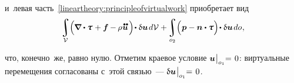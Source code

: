 \begin{otherlanguage}{russian}
\vspace{-0.2em} \noindent и~левая часть~\eqref{lineartheory:principleofvirtualwork} приобретает вид
\[
\integral\displaylimits_{\mathcal{V}} \hspace{-0.5ex} \left(^{\mathstrut} \hspace{-0.2ex} \boldnabla \dotp \mathboldtau \hspace{0.12ex} + \bm{f} \hspace{-0.1ex} - \hspace{-0.1ex} \rho \hspace{0.1ex} \mathdotdotabove{\bm{u}} \hspace{0.25ex} \right) \hspace{-0.32ex} \dotp \variation{\bm{u}} \hspace{0.25ex} d\mathcal{V} + \hspace{-0.2ex}
\integral\displaylimits_{o_2} \hspace{-0.5ex} \left(^{\mathstrut} \bm{p} - \bm{n} \dotp \mathboldtau \right) \hspace{-0.32ex} \dotp \variation{\bm{u}} \hspace{0.25ex} do \hspace{0.1ex},
\]

\vspace{-0.4em} \noindent что, конечно~же, равно нулю. Отметим краевое условие ${\bm{u} \hspace{0.1ex} \bigr|_{o_1} \hspace{-0.64ex} = \hspace{0.2ex} 0}$: виртуальные перемещения согласованы с~этой связью~--- ${\updelta\hspace{-0.1ex}\bm{u} \hspace{0.1ex} \bigr|_{o_1} \hspace{-0.64ex} = \hspace{0.2ex} 0}$.

\end{otherlanguage}



\label{para:uniquenessfordynamicproblem}

